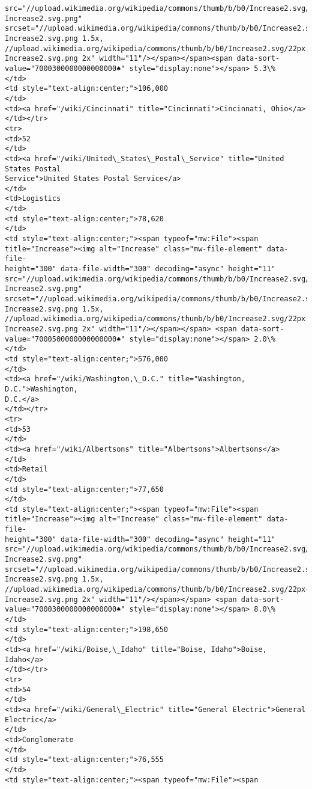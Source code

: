 \documentclass[11pt]{article}
\begin{document}
\begin{Verbatim}[commandchars=\\\{\}]
src="//upload.wikimedia.org/wikipedia/commons/thumb/b/b0/Increase2.svg/11px-
Increase2.svg.png"
srcset="//upload.wikimedia.org/wikipedia/commons/thumb/b/b0/Increase2.svg/17px-
Increase2.svg.png 1.5x,
//upload.wikimedia.org/wikipedia/commons/thumb/b/b0/Increase2.svg/22px-
Increase2.svg.png 2x" width="11"/></span></span><span data-sort-
value="7000300000000000000♠" style="display:none"></span> 5.3\%
</td>
<td style="text-align:center;">106,000
</td>
<td><a href="/wiki/Cincinnati" title="Cincinnati">Cincinnati, Ohio</a>
</td></tr>
<tr>
<td>52
</td>
<td><a href="/wiki/United\_States\_Postal\_Service" title="United States Postal
Service">United States Postal Service</a>
</td>
<td>Logistics
</td>
<td style="text-align:center;">78,620
</td>
<td style="text-align:center;"><span typeof="mw:File"><span
title="Increase"><img alt="Increase" class="mw-file-element" data-file-
height="300" data-file-width="300" decoding="async" height="11"
src="//upload.wikimedia.org/wikipedia/commons/thumb/b/b0/Increase2.svg/11px-
Increase2.svg.png"
srcset="//upload.wikimedia.org/wikipedia/commons/thumb/b/b0/Increase2.svg/17px-
Increase2.svg.png 1.5x,
//upload.wikimedia.org/wikipedia/commons/thumb/b/b0/Increase2.svg/22px-
Increase2.svg.png 2x" width="11"/></span></span> <span data-sort-
value="7000500000000000000♠" style="display:none"></span> 2.0\%
</td>
<td style="text-align:center;">576,000
</td>
<td><a href="/wiki/Washington,\_D.C." title="Washington, D.C.">Washington,
D.C.</a>
</td></tr>
<tr>
<td>53
</td>
<td><a href="/wiki/Albertsons" title="Albertsons">Albertsons</a>
</td>
<td>Retail
</td>
<td style="text-align:center;">77,650
</td>
<td style="text-align:center;"><span typeof="mw:File"><span
title="Increase"><img alt="Increase" class="mw-file-element" data-file-
height="300" data-file-width="300" decoding="async" height="11"
src="//upload.wikimedia.org/wikipedia/commons/thumb/b/b0/Increase2.svg/11px-
Increase2.svg.png"
srcset="//upload.wikimedia.org/wikipedia/commons/thumb/b/b0/Increase2.svg/17px-
Increase2.svg.png 1.5x,
//upload.wikimedia.org/wikipedia/commons/thumb/b/b0/Increase2.svg/22px-
Increase2.svg.png 2x" width="11"/></span></span> <span data-sort-
value="7000300000000000000♠" style="display:none"></span> 8.0\%
</td>
<td style="text-align:center;">198,650
</td>
<td><a href="/wiki/Boise,\_Idaho" title="Boise, Idaho">Boise, Idaho</a>
</td></tr>
<tr>
<td>54
</td>
<td><a href="/wiki/General\_Electric" title="General Electric">General
Electric</a>
</td>
<td>Conglomerate
</td>
<td style="text-align:center;">76,555
</td>
<td style="text-align:center;"><span typeof="mw:File"><span

\end{Verbatim}
\end{document}
